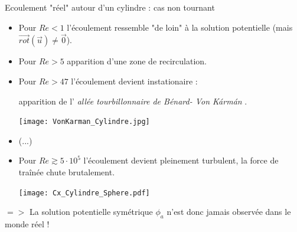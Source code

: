 
 





%



\begin{frame}{Ecoulement "réel" autour d'un cylindre : cas non tournant}  \hypertarget{frame:toto}{}

\small

\begin{itemize}[<+-| alert@+>]
\item Pour $Re <1$ l'écoulement ressemble "de loin" à la solution potentielle (mais $\vec{rot}({\vec  u}) \ne \vec 0$).

\item Pour $Re > 5$ apparition d'une zone de recirculation.

\item Pour $Re > 47$ l'écoulement devient instationaire : 

apparition de l' {\em allée tourbillonnaire de Bénard- Von K\'arm\'an}  .

\texttt{[image: VonKarman\_Cylindre.jpg]}

\item (...)

\item Pour $Re \gtrsim 5 \cdot 10^5$  l'écoulement devient pleinement turbulent, la force de traînée chute brutalement.

\texttt{[image: Cx\_Cylindre\_Sphere.pdf]}


\end{itemize}

\pause
$=>$ La solution potentielle symétrique $\phi_a$ n'est donc jamais observée dans le monde réel !





\end{frame}






